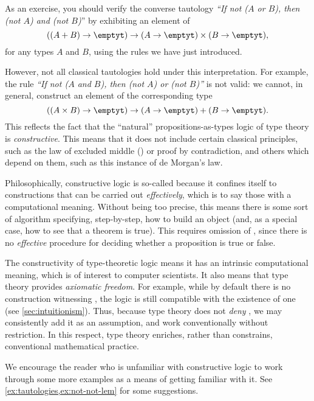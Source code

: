 As an exercise, you should verify 
the converse tautology \emph{``If not ($A$ or $B$), then  (not $A$) and (not $B$)}'' by exhibiting an element of 
\[ ((A + B) \to \emptyt) \to (A \to \emptyt) \times (B \to \emptyt), \]
for any types $A$ and $B$, using the rules we have just introduced.

However, not all classical tautologies hold under this interpretation.
For example, the rule 
\emph{``If not ($A$ and $B$), then (not $A$) or (not $B$)''} is not valid: we cannot, in general, construct an element of the corresponding type
\[ ((A \times B) \to \emptyt) \to (A \to \emptyt) + (B \to \emptyt).\]
This reflects the fact that the ``natural'' propositions-as-types logic of type theory is \emph{constructive}.
This means that it does not include certain classical principles, such as the law of excluded middle (\LEM{})
or proof by contradiction,
and others which depend on them, such as this instance of de Morgan's law.
%
%

Philosophically, constructive logic is so-called because it confines itself to constructions that can be carried out \emph{effectively}, which is to say those with a computational meaning.
Without being too precise, this means there is some sort of algorithm specifying, step-by-step, how to build an object (and, as a special case, how to see that a theorem is true).
This requires omission of \LEM{}, since there is no \emph{effective} procedure for deciding whether a proposition is true or false.

The constructivity of type-theoretic logic means it has an intrinsic computational meaning, which is of interest to computer scientists.
It also means that type theory provides \emph{axiomatic freedom}.
For example, while by default there is no construction witnessing \LEM{}, the logic is still compatible with the existence of one (see \cref{sec:intuitionism}).
Thus, because type theory does not \emph{deny} \LEM{}, we may consistently add it as an assumption, and work conventionally without restriction.
In this respect, type theory enriches, rather than constrains, conventional mathematical practice.

We encourage the reader who is unfamiliar with constructive logic to work through some more examples as a means of getting familiar with it.
See \cref{ex:tautologies,ex:not-not-lem} for some suggestions.


